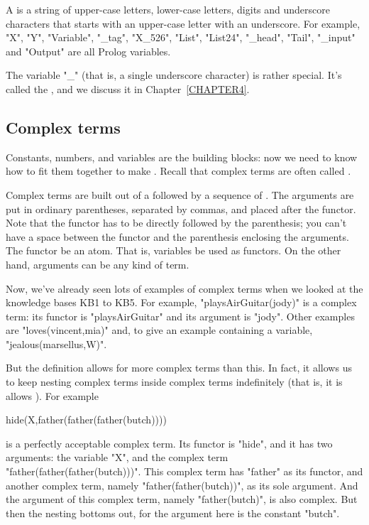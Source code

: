 A  is a string of upper-case letters, lower-case letters,
digits and underscore characters that starts  with an
upper-case letter  with an underscore.  For example, "X",
"Y", "Variable", "_tag", "X_526",  "List", "List24", "_head",
"Tail", "_input" and "Output" are all Prolog variables.

The variable "_" (that is, a single underscore character) is rather
special.  It's called the , and we discuss
it in Chapter~\ref{CHAPTER4}.



\subsection*{Complex terms}\label{SUBSEC.L1.COMPLEX.TERMS}

Constants, numbers, and variables are the building blocks: now we need
to know how to fit them together to make .
Recall that complex terms are often called .

Complex terms are built out of a  followed by a
sequence of . The arguments are put in ordinary
parentheses, separated by commas, and placed after the functor. Note
that the functor has to be directly followed by the parenthesis; you
can't have a space between the functor and the parenthesis enclosing
the arguments. The functor  be an atom.  That is,
variables  be used as functors.  On the other hand,
arguments can be any kind of term.

Now, we've already seen lots of examples of complex terms when we
looked at the knowledge bases KB1 to KB5. For example,
"playsAirGuitar(jody)" is a complex term: its functor is
"playsAirGuitar" and its argument is "jody".  Other examples are
"loves(vincent,mia)" and, to give an example containing a variable,
"jealous(marsellus,W)".

But  the definition allows for  more complex terms than this.
In fact, it allows us to keep nesting complex terms inside complex
terms indefinitely (that is, it is allows  ).
For example
%
\begin{LPNcodedisplay}
hide(X,father(father(father(butch))))
\end{LPNcodedisplay}
%
is a perfectly acceptable complex term. Its functor is "hide", and it
has two arguments: the variable "X", and the complex term
"father(father(father(butch)))". This complex term has "father" as its
functor, and another complex term, namely "father(father(butch))", as
its sole argument. And the argument of this complex term, namely
"father(butch)", is also complex.  But then the nesting bottoms
out, for the argument here is the constant "butch".


